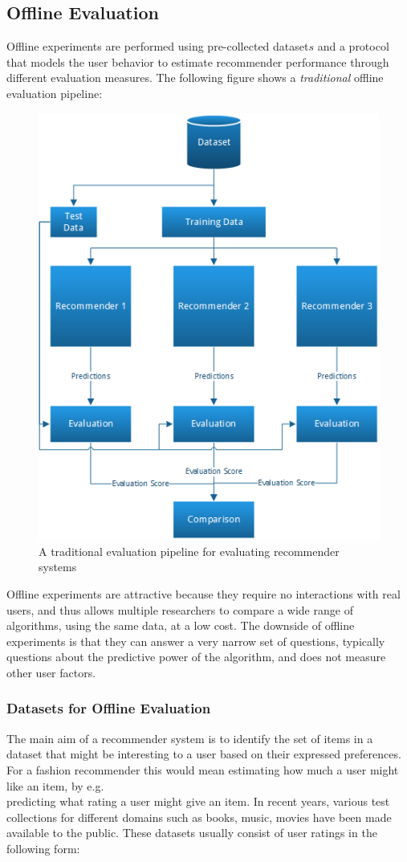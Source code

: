 \subsection{Offline Evaluation}
Offline experiments are performed using pre-collected dataset\(s\) and a protocol
that models the user behavior to estimate recommender performance through
different evaluation measures. The following figure shows a \emph{traditional}
offline evaluation pipeline:

\begin{figure}[H]
		\centering
	  	\includegraphics[height=0.65\linewidth]{image/evaluationpipeline.png}
		\caption[A Traditional Evaluation Pipeline]{A traditional evaluation pipeline for evaluating recommender systems}
		\label{figure:evaluationpipeline}
\end{figure}


Offline experiments are attractive because they
require no interactions with real users, and thus allows multiple  researchers to compare
a wide range of algorithms, using the same data, at a low cost. The downside of offline experiments
is that they can answer a very narrow set of questions, typically questions
about the predictive power of the algorithm, and does not measure other user
factors.

\subsubsection{Datasets for Offline Evaluation}

The main aim of a recommender system is to identify the set of items in a
dataset that might be interesting to a user based on their expressed
preferences. For a fashion recommender this would mean estimating how much a
user might like an item, by e.g.\\ predicting what rating a user might give an
item. In recent years, various test collections for different domains such as
books, music, movies have been made available to the public. These datasets
usually consist of user ratings in the following form:

